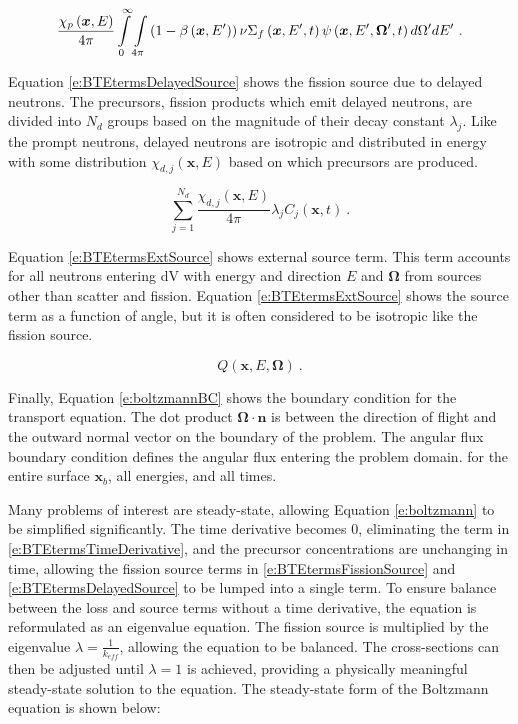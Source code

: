 \begin{equation}\label{e:BTEtermsFissionSource}
{\frac{\chi_p\left(\bm x,E\right)}{4\pi} \intop_0^{\infty} \intop_{4\pi} \left(1 - \beta\left(\bm x,E'\right)\right) \nu \Sigma_f\left(\bm x,E',t\right) \psi\left(\bm x,E',\bm \Omega',t\right) d\Omega' dE'}\ .
\end{equation}

Equation \ref{e:BTEtermsDelayedSource} shows the fission source due to delayed neutrons.  The precursors, fission products which emit delayed neutrons, are divided into $N_d$ groups based on the magnitude of their decay constant $\lambda_j$.  Like the prompt neutrons, delayed neutrons are isotropic and distributed in energy with some distribution $\chi_{d,j}\left(\bm x,E\right)$ based on which precursors are produced.

\begin{equation}\label{e:BTEtermsDelayedSource}
{\sum_{j=1}^{N_d} \frac{\chi_{d,j}\left(\bm x,E\right)}{4\pi} \lambda_j C_j\left(\bm x,t\right)}\ .
\end{equation}

Equation \ref{e:BTEtermsExtSource} shows external source term.  This term accounts for all neutrons entering dV with energy and direction $E$ and $\bm\Omega$ from sources other than scatter and fission.  Equation \ref{e:BTEtermsExtSource} shows the source term as a function of angle, but it is often considered to be isotropic like the fission source.

\begin{equation}\label{e:BTEtermsExtSource}
Q\left(\bm x,E,\bm\Omega\right)\ .
\end{equation}

Finally, Equation \ref{e:boltzmannBC} shows the boundary condition for the transport equation.  The dot product $\bm \Omega \cdot \bm n$ is between the direction of flight and the outward normal vector on the boundary of the problem.  The angular flux boundary condition defines the angular flux entering the problem domain. for the entire surface $\bm x_b$, all energies, and all times.

Many problems of interest are steady-state, allowing Equation \ref{e:boltzmann} to be simplified significantly.  The time derivative becomes 0, eliminating the term in \ref{e:BTEtermsTimeDerivative}, and the precursor concentrations are unchanging in time, allowing the fission source terms in \ref{e:BTEtermsFissionSource} and \ref{e:BTEtermsDelayedSource} to be lumped into a single term.  To ensure balance between the loss and source terms without a time derivative, the equation is reformulated as an eigenvalue equation.  The fission source is multiplied by the eigenvalue $\lambda = \frac{1}{k_{eff}}$, allowing the equation to be balanced.  The cross-sections can then be adjusted until $\lambda = 1$ is achieved, providing a physically meaningful steady-state solution to the equation.  The steady-state form of the Boltzmann equation is shown below:

